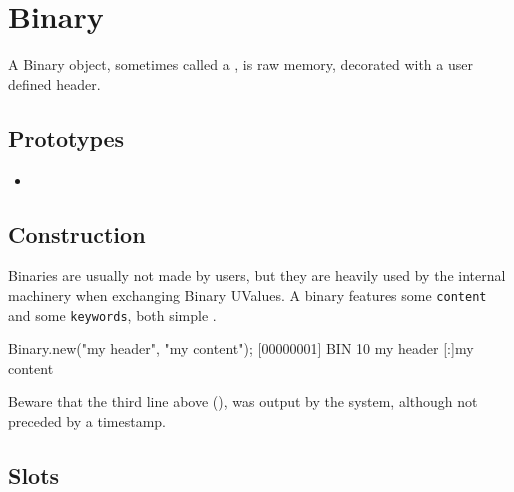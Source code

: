 \section{Binary}

A Binary object, sometimes called a , is raw memory,
decorated with a user defined header.

\subsection{Prototypes}
\begin{itemize}
\item {}
\end{itemize}

\subsection{Construction}

Binaries are usually not made by users, but they are heavily used by
the internal machinery when exchanging Binary UValues.  A binary
features some \lstinline|content| and some \lstinline|keywords|, both
simple .

\begin{urbiscript}
Binary.new("my header", "my content");
[00000001] BIN 10 my header
[:]my content
\end{urbiscript}

Beware that the third line above (), was output by
the system, although not preceded by a timestamp.

\subsection{Slots}

